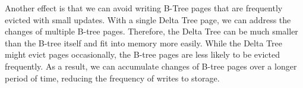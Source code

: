 Another effect is that we can avoid writing B-Tree pages that are frequently evicted with small updates.
With a single Delta Tree page, we can address the changes of multiple B-tree pages.
Therefore, the Delta Tree can be much smaller than the B-tree itself and fit into memory more easily.
While the Delta Tree might evict pages occasionally, the B-tree pages are less likely to be evicted frequently.
As a result, we can accumulate changes of B-tree pages over a longer period of time, reducing the frequency of writes to storage.